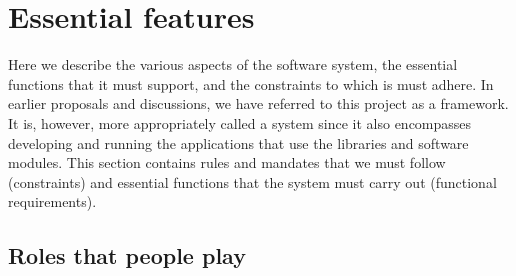 \documentclass[draftmode,draftwater]{memarticle}
\begin{document}
\chapter{Essential features}

Here we describe the various aspects of the software system, the
essential functions that it must support, and the constraints to which
is must adhere. In earlier proposals and discussions, we have referred
to this project as a framework. It is, however, more appropriately
called a system since it also encompasses developing and running the
applications that use the libraries and software modules. This section
contains rules and mandates that we must follow (constraints) and
essential functions that the system must carry out (functional
requirements).

\section{Roles that people play}
\end{document}
